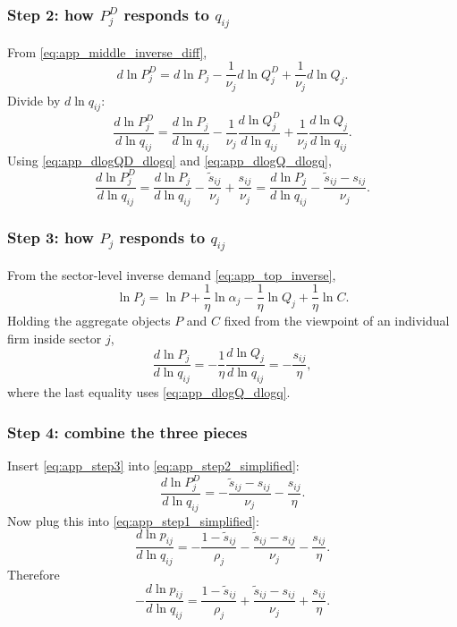 \subsubsection{Step 2: how $P_j^D$ responds to $q_{ij}$}

From \eqref{eq:app_middle_inverse_diff},
\[
d \ln P_j^D
=
d \ln P_j
- \frac{1}{\nu_j} d \ln Q_j^D
+ \frac{1}{\nu_j} d \ln Q_j.
\]
Divide by $d \ln q_{ij}$:
\begin{equation}
\frac{d \ln P_j^D}{d \ln q_{ij}}
=
\frac{d \ln P_j}{d \ln q_{ij}}
- \frac{1}{\nu_j} \frac{d \ln Q_j^D}{d \ln q_{ij}}
+ \frac{1}{\nu_j} \frac{d \ln Q_j}{d \ln q_{ij}}.
\label{eq:app_step2}
\end{equation}
Using \eqref{eq:app_dlogQD_dlogq} and \eqref{eq:app_dlogQ_dlogq},
\begin{equation}
\frac{d \ln P_j^D}{d \ln q_{ij}}
=
\frac{d \ln P_j}{d \ln q_{ij}}
- \frac{\tilde{s}_{ij}}{\nu_j}
+ \frac{s_{ij}}{\nu_j}
=
\frac{d \ln P_j}{d \ln q_{ij}}
- \frac{\tilde{s}_{ij} - s_{ij}}{\nu_j}.
\label{eq:app_step2_simplified}
\end{equation}

\subsubsection{Step 3: how $P_j$ responds to $q_{ij}$}

From the sector-level inverse demand \eqref{eq:app_top_inverse},
\[
\ln P_j
=
\ln P
+ \frac{1}{\eta} \ln \alpha_j
- \frac{1}{\eta} \ln Q_j
+ \frac{1}{\eta} \ln C.
\]
Holding the aggregate objects $P$ and $C$ fixed from the viewpoint of an individual firm inside sector $j$,
\begin{equation}
\frac{d \ln P_j}{d \ln q_{ij}}
=
- \frac{1}{\eta} \frac{d \ln Q_j}{d \ln q_{ij}}
=
- \frac{s_{ij}}{\eta},
\label{eq:app_step3}
\end{equation}
where the last equality uses \eqref{eq:app_dlogQ_dlogq}.

\subsubsection{Step 4: combine the three pieces}

Insert \eqref{eq:app_step3} into \eqref{eq:app_step2_simplified}:
\[
\frac{d \ln P_j^D}{d \ln q_{ij}}
=
- \frac{\tilde{s}_{ij} - s_{ij}}{\nu_j}
- \frac{s_{ij}}{\eta}.
\]
Now plug this into \eqref{eq:app_step1_simplified}:
\[
\frac{d \ln p_{ij}}{d \ln q_{ij}}
=
- \frac{1-\tilde{s}_{ij}}{\rho_j}
- \frac{\tilde{s}_{ij} - s_{ij}}{\nu_j}
- \frac{s_{ij}}{\eta}.
\]
Therefore
\begin{equation}
- \frac{d \ln p_{ij}}{d \ln q_{ij}}
=
\frac{1-\tilde{s}_{ij}}{\rho_j}
+
\frac{\tilde{s}_{ij} - s_{ij}}{\nu_j}
+
\frac{s_{ij}}{\eta}.
\label{eq:app_inverse_demand_elasticity}
\end{equation}

